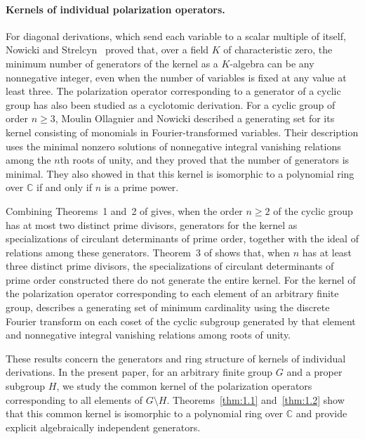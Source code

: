 \documentclass[12pt,a4paper]{article}
\theoremstyle{definition}
\numberwithin{definition}{section}
\begin{document}
\paragraph{Kernels of individual polarization operators.}
For diagonal derivations, which send each variable to a scalar multiple of
itself, Nowicki and Strelcyn~\cite[Theorem~1]{NowickiStrelcyn1995} proved that,
over a field $K$ of characteristic zero, the minimum number of generators
of the kernel as a $K$-algebra can be any nonnegative integer, even when
the number of variables is fixed at any value at least three.
The polarization operator corresponding to a generator of a cyclic group
has also been studied as a cyclotomic derivation.
For a cyclic group of order $n\ge3$, Moulin Ollagnier and Nowicki
\cite[Propositions~2.3 and~3.1]{MoulinOllagnierNowicki2013} described a
generating set for its kernel consisting of monomials in Fourier-transformed
variables. Their description uses the minimal nonzero solutions of
nonnegative integral vanishing relations among the $n$th roots of unity,
and they proved that the number of generators is minimal.
They also showed in \cite[Theorem~3.7]{MoulinOllagnierNowicki2013} that this
kernel is isomorphic to a polynomial ring over $\mathbb C$ if and only if
$n$ is a prime power.

Combining Theorems~1 and~2 of \cite{YamaguchiOchiaiYamaguchi2025} gives,
when the order $n\ge2$ of the cyclic group has at most two distinct prime
divisors, generators for the kernel as specializations of circulant
determinants of prime order, together with the ideal of relations among
these generators.
Theorem~3 of \cite{YamaguchiOchiaiYamaguchi2025} shows that, when $n$ has
at least three distinct prime divisors, the specializations of circulant
determinants of prime order constructed there do not generate the entire kernel.
For the kernel of the polarization operator corresponding to each element
of an arbitrary finite group, \cite[Theorems~1 and~3]{Yamaguchi2026Kernels}
describes a generating set of minimum cardinality using the discrete
Fourier transform on each coset of the cyclic subgroup generated by that
element and nonnegative integral vanishing relations among roots of unity.

These results concern the generators and ring structure of kernels of
individual derivations.
In the present paper, for an arbitrary finite group $G$ and a proper
subgroup $H$, we study the common kernel of the polarization operators
corresponding to all elements of $G\setminus H$.
Theorems~\ref{thm:1.1} and~\ref{thm:1.2} show that this common kernel is
isomorphic to a polynomial ring over $\mathbb C$ and provide explicit
algebraically independent generators.
\end{document}
